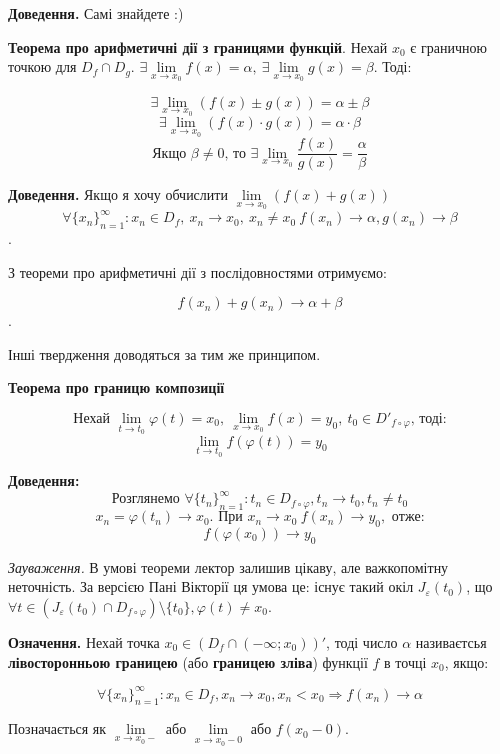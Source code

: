 \documentclass[12pt]{report}
\begin{document}
\textbf{Доведення.} Самі знайдете :)

\vspace{5mm}

\textbf{Теорема про арифметичні дії з границями функцій}. Нехай $x_0$ є граничною точкою для $D_f \cap D_g$. $\exists \lim\limits_{x \to x_0}f(x) = \alpha , \ \exists \lim\limits_{x \to x_0}g(x) = \beta$. Тоді:

$$\exists \lim_{x \to x_0}(f(x) \pm g(x)) = \alpha \pm \beta$$
$$\exists \lim_{x \to x_0}(f(x) \cdot g(x)) = \alpha \cdot \beta$$
$$\textrm{Якщо $\beta \neq 0$, то }\exists \lim_{x \to x_0}\frac{f(x)}{g(x)} = \frac{\alpha}{\beta}$$

\textbf{Доведення.} Якщо я хочу обчислити $\lim\limits_{x\to x_0}(f(x) + g(x))$
$$\forall \{x_n \}_{n=1}^{\infty} : x_n \in D_f,\ x_n \to x_0,\ x_n \neq x_0 \  f(x_n) \to \alpha, g(x_n) \to \beta$$.

З теореми про арифметичні дії з послідовностями отримуємо:

$$f(x_n) + g(x_n) \to \alpha + \beta$$.

Інші твердження доводяться за тим же принципом.

\textbf{Теорема про границю композиції}

$$\textrm{Нехай } \lim_{t \to t_0}\varphi(t) = x_0,\ \lim_{x \to x_0}f(x) = y_0,\ t_0 \in D'_{f \circ \varphi}\textrm{, тоді:}$$
$$\lim_{t\to t_0}f(\varphi(t)) = y_0$$

\textbf{Доведення:}
$$\textrm{Розглянемо } \forall \{ t_n \}_{n=1}^{\infty} : t_n \in D_{f \circ \varphi}, t_n \to t_0, t_n \neq t_0$$
$$x_n = \varphi(t_n) \to x_0. \textrm{ При } x_n \to x_0 \ f(x_n) \to y_0, \textrm{ отже:}$$
$$f(\varphi(x_0)) \to y_0$$

\textit{Зауваження.} В умові теореми лектор залишив цікаву, але важкопомітну неточність. За версією Пані Вікторії ця умова  це: існує такий окіл $J_{\varepsilon}(t_0)$, що $\forall t \in (J_{\varepsilon}(t_0) \cap D_{f \circ \varphi})\setminus \{ t_0\}, \varphi ( t ) \neq x_0$.

\vspace{5mm}

\textbf{Означення.} Нехай точка $x_0 \in (D_f \cap (-\infty;x_0))'$, тоді число $\alpha$ називаєтсья \textbf{лівосторонньою границею} (або \textbf{границею зліва}) функції $f$ в точці $x_0$, якщо:

$$\forall \{ x_n \}_{n=1}^{\infty} : x_n \in D_f, x_n \to x_0, x_n < x_0 \Longrightarrow f(x_n) \to \alpha$$

Позначається як $\lim\limits_{x\to x_0-}$ або $\lim\limits_{x \to x_0-0}$ або $f(x_0 - 0)$.
\end{document}
